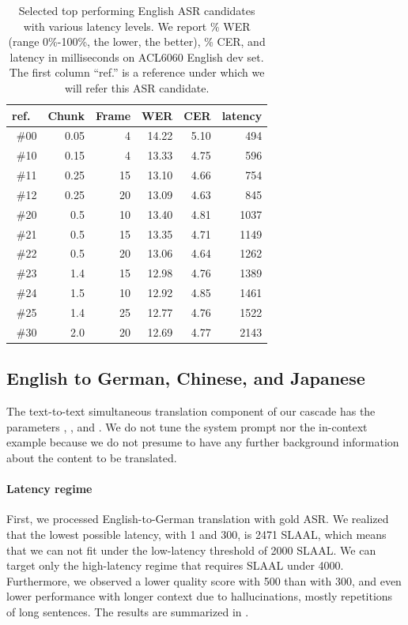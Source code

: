 \documentclass[11pt]{article}
\begin{document}
\begin{table}[]
    \centering
    \begin{tabular}{r|r@{~}r|r@{~}r@{~}r}
ref.\ & Chunk & Frame & WER & CER & latency  \\
\hline
\#00 & 0.05 & 4 & 14.22 & 5.10 & 494\\
\#10 & 0.15 & 4 & 13.33 & 4.75 & 596\\
\#11 & 0.25 & 15 & 13.10 & 4.66 & 754\\
\#12 & 0.25 & 20 & 13.09 & 4.63 & 845\\
\#20 & 0.5 & 10 & 13.40 & 4.81 & 1037\\
\#21 & 0.5 & 15 & 13.35 & 4.71 & 1149\\
\#22 & 0.5 & 20 & 13.06 & 4.64 & 1262\\
\#23 & 1.4 & 15 & 12.98 & 4.76 & 1389\\
\#24 & 1.5 & 10 & 12.92 & 4.85 & 1461\\
\#25 & 1.4 & 25 & 12.77 & 4.76 & 1522\\
\#30 & 2.0 & 20 & 12.69 & 4.77 & 2143\\
    \end{tabular}
    \caption{Selected top performing English ASR candidates with various latency levels. We report \% WER (range 0\%-100\%, the lower, the better), \% CER, and latency in milliseconds on ACL6060 English dev set. The first column ``ref.'' is a reference under which we will refer this ASR candidate.}
    \label{tab:asr}
\end{table}

\subsection{English to German, Chinese, and Japanese}

The text-to-text simultaneous translation component of our cascade has the parameters \MinChunkSize{}, \MaxContextLen{}, and \BufferTrimmingStrategy{}. We do not tune the system prompt nor the in-context example because we do not presume to have any further background information about the content to be translated.

\paragraph{Latency regime} First, we processed English-to-German translation with gold ASR. We realized that the lowest possible latency, with \MinChunkSize{} 1 and \MaxContextLen{} 300, is 2471 SLAAL, which means that we can not fit under the low-latency threshold of 2000 SLAAL. We can target only the high-latency regime that requires SLAAL under 4000. Furthermore, we observed a lower quality score with \MaxContextLen{} 500 than with 300, and even lower performance with longer context due to hallucinations, mostly repetitions of long sentences. The results are summarized in .
\end{document}

